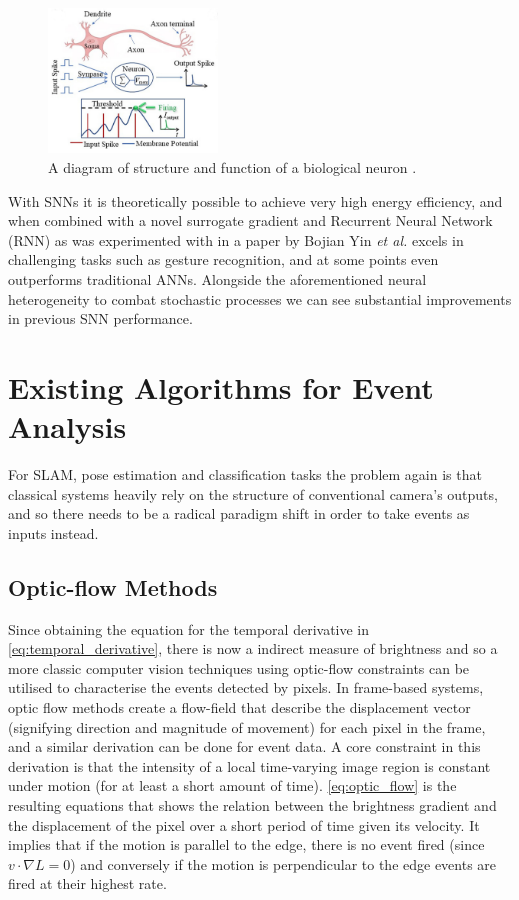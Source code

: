 \begin{figure}[htb]
      \centering
      \includegraphics[width=0.4\textwidth]{background/images/biological_neuron.png}
      \caption{A diagram of structure and function of a biological neuron \cite{BiologicalNeuronModel}.}
      \label{fig:biological_neuron}
\end{figure}

With SNNs it is theoretically possible to achieve very high energy efficiency, and when combined with a novel surrogate gradient and Recurrent Neural Network (RNN) as was experimented with in a paper by Bojian Yin \textit{et al.}\cite{EfficientSNN} excels in challenging tasks such as gesture recognition, and at some points even outperforms traditional ANNs. Alongside the aforementioned neural heterogeneity to combat stochastic processes we can see substantial improvements in previous SNN performance.

\section{Existing Algorithms for Event Analysis} \label{sec:existing_algorithms}

For SLAM, pose estimation and classification tasks the problem again is that classical systems heavily rely on the structure of conventional camera's outputs, and so there needs to be a radical paradigm shift in order to take events as inputs instead.

\subsection{Optic-flow Methods}

Since obtaining the equation for the temporal derivative in \cref{eq:temporal_derivative}, there is now a indirect measure of brightness and so a more classic computer vision techniques using optic-flow constraints can be utilised to characterise the events detected by pixels. In frame-based systems, optic flow methods create a flow-field that describe the displacement vector (signifying direction and magnitude of movement) for each pixel in the frame, and a similar derivation can be done for event data. A core constraint in this derivation is that the intensity of a local time-varying image region is constant under motion (for at least a short amount of time)\cite{GenerativeEventModel}. \cref{eq:optic_flow} is the resulting equations that shows the relation between the brightness gradient and the displacement of the pixel over a short period of time given its velocity\cite{EventBasedVisionASurvery}. It implies that if the motion is parallel to the edge, there is no event fired (since $ v \cdot \nabla L = 0  $) and conversely if the motion is perpendicular to the edge events are fired at their highest rate.

